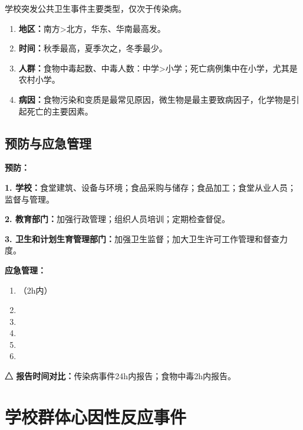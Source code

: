 \begin{keybox}
学校突发公共卫生事件主要类型，仅次于传染病。

\begin{enumerate}[leftmargin=*]
    \item \textbf{地区：}南方>北方，华东、华南最高发。
    \item \textbf{时间：}秋季最高，夏季次之，冬季最少。
    \item \textbf{人群：}食物中毒起数、中毒人数：中学>小学；死亡病例集中在小学，尤其是农村小学。
    \item \textbf{病因：}食物污染和变质是最常见原因，微生物是最主要致病因子，化学物是引起死亡的主要因素。
\end{enumerate}
\end{keybox}

\subsection{预防与应急管理}

\begin{keybox}
\textbf{预防：}

\textbf{1. 学校：}食堂建筑、设备与环境；食品采购与储存；食品加工；食堂从业人员；监督与管理。

\textbf{2. 教育部门：}加强行政管理；组织人员培训；定期检查督促。

\textbf{3. 卫生和计划生育管理部门：}加强卫生监督；加大卫生许可工作管理和督查力度。

\textbf{应急管理：}

\begin{enumerate}[leftmargin=*]
    \item {}（2h内）
    \item {}
    \item {}
    \item {}
    \item {}
    \item {}
\end{enumerate}
\end{keybox}

\begin{exambox}
\textbf{△ 报告时间对比：}传染病事件24h内报告；食物中毒2h内报告。
\end{exambox}

\section{学校群体心因性反应事件}

